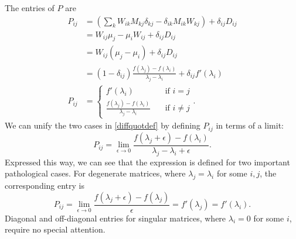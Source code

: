 \documentclass[../../main.tex]{subfiles}
\begin{document}
\begin{refsection}
	The entries of $P$ are
	\begin{align}
		P_{ij}
		 & = \left( \sum_k W_{ik} M_{kj} \delta_{kj} - \delta_{ik} M_{ik} W_{kj} \right) +
		\delta_{ij} D_{ij}  \nonumber                                                      \\
		 & = W_{ij} \mu_j - \mu_i W_{ij} + \delta_{ij} D_{ij}   \nonumber                  \\
		 & = W_{ij} (\mu_j - \mu_i) + \delta_{ij} D_{ij}  \nonumber                        \\
		 & = (1 - \delta_{ij}) \frac{f(\lambda_j) - f(\lambda_i)}{\lambda_j - \lambda_i} +
		\delta_{ij} f'(\lambda_i)   \nonumber                                              \\
		P_{ij}
		 & = \begin{cases}
			f'(\lambda_i) \quad                                             & \text{if } i = j   \\
			\frac{f(\lambda_j) - f(\lambda_i)}{\lambda_j - \lambda_i} \quad & \text{if } i \ne j
		\end{cases} \label{diffquotdef}.
	\end{align}
	We can unify the two cases in \cref{diffquotdef} by defining $P_{ij}$ in terms of a limit:
	\begin{equation} \label{diffquot}
		P_{ij} = \lim_{\epsilon \to 0}
		\frac{f(\lambda_j + \epsilon) - f(\lambda_i)}{\lambda_j - \lambda_i + \epsilon}.
	\end{equation}
	Expressed this way, we can see that the expression is defined for two important pathological cases.
	For degenerate matrices, where $\lambda_j = \lambda_i$ for some $i,j$, the corresponding entry is
	\begin{equation*}
		P_{ij} = \lim_{\epsilon \to 0}
		\frac{f(\lambda_j + \epsilon) - f(\lambda_j)}{\epsilon}
		= f'(\lambda_j) = f'(\lambda_i).
	\end{equation*}
	Diagonal and off-diagonal entries for singular matrices, where $\lambda_i=0$ for some $i$, require no special attention.


\end{refsection}
\end{document}
